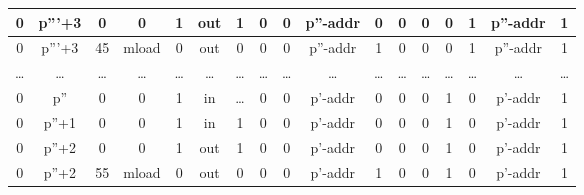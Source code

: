 \begin{table}[!ht]
\begin{adjustwidth}{-1.75cm}{}
\begin{tabular}{|c|c|c|c|c|c|c|c|c|c|c|c|c|c|c|c|c|}
            \hline
            \rowcolor{yellow!20} 0     & p'''+3 & 0     & 0      & 1         & out   & \cellcolor{lightgray} 1        & \cellcolor{lightgray} 0     & \cellcolor{lightgray} 0     & p''-addr                & \cellcolor{violet!30} 0     & 0     & \cellcolor{pink} 0     & \cellcolor{pink} 0     & \cellcolor{pink} 1     & p''-addr & 1     \\
            \hline
            \rowcolor{yellow!20} 0     & p'''+3 & 45    & mload  & 0         & out   & \cellcolor{lightgray} 0        & \cellcolor{lightgray} 0     & \cellcolor{lightgray} 0     & p''-addr                & \cellcolor{violet!30} 1     & 0     & \cellcolor{pink} 0     & \cellcolor{pink} 0     & \cellcolor{pink} 1     & p''-addr & 1     \\
            \hline
            \rowcolor{yellow!20} \dots & \dots  & \dots & \dots  & \dots     & \dots & \cellcolor{lightgray} \dots    & \cellcolor{lightgray} \dots & \cellcolor{lightgray} \dots & \dots                   & \cellcolor{violet!30} \dots & \dots & \cellcolor{pink} \dots & \cellcolor{pink} \dots & \cellcolor{pink} \dots & \dots    & \dots \\
            \hline
            \rowcolor{yellow!20} 0     & p''    & 0     & 0      & 1         & in    & \cellcolor{lightgray} \dots    & \cellcolor{lightgray} 0     & \cellcolor{lightgray} 0     & p'-addr                 & \cellcolor{violet!30} 0     & 0     & \cellcolor{pink} 0     & \cellcolor{pink} 1     & \cellcolor{pink} 0     & p'-addr  & 1     \\
            \hline
            \rowcolor{yellow!20} 0     & p''+1  & 0     & 0      & 1         & in    & \cellcolor{lightgray} 1        & \cellcolor{lightgray} 0     & \cellcolor{lightgray} 0     & p'-addr                 & \cellcolor{violet!30} 0     & 0     & \cellcolor{pink} 0     & \cellcolor{pink} 1     & \cellcolor{pink} 0     & p'-addr  & 1     \\
            \hline
            \rowcolor{yellow!20} 0     & p''+2  & 0     & 0      & 1         & out   & \cellcolor{lightgray} 1        & \cellcolor{lightgray} 0     & \cellcolor{lightgray} 0     & p'-addr                 & \cellcolor{violet!30} 0     & 0     & \cellcolor{pink} 0     & \cellcolor{pink} 1     & \cellcolor{pink} 0     & p'-addr  & 1     \\
            \hline
            \rowcolor{yellow!20} 0     & p''+2  & 55    & mload  & 0         & out   & \cellcolor{lightgray} 0        & \cellcolor{lightgray} 0     & \cellcolor{lightgray} 0     & p'-addr                 & \cellcolor{violet!30} 1     & 0     & \cellcolor{pink} 0     & \cellcolor{pink} 1     & \cellcolor{pink} 0     & p'-addr  & 1     \\

\end{tabular}
\end{adjustwidth}
\end{table}
